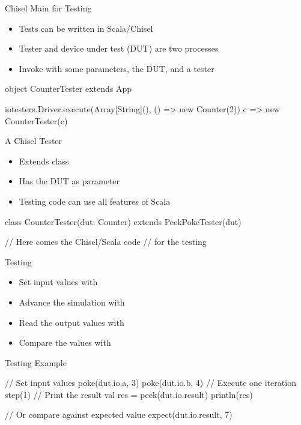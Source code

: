 \begin{frame}[fragile]{Chisel Main for Testing}
\begin{itemize}
\item Tests can be written in Scala/Chisel
\item Tester and device under test (DUT) are two processes
\item Invoke  with some parameters, the DUT, and a tester
\end{itemize}
\begin{chisel}
object CounterTester extends App {

  iotesters.Driver.execute(Array[String](), () => new Counter(2)) {
    c => new CounterTester(c)
  }
}
\end{chisel}
\end{frame}

\begin{frame}[fragile]{A Chisel Tester}
\begin{itemize}
\item Extends class 
\item Has the DUT as parameter
\item Testing code can use all features of Scala
\end{itemize}
\begin{chisel}
class CounterTester(dut: Counter) extends PeekPokeTester(dut) {

  // Here comes the Chisel/Scala code
  // for the testing
}
\end{chisel}
\end{frame}

\begin{frame}[fragile]{Testing}
\begin{itemize}
\item Set input values with 
\item Advance the simulation with 
\item Read the output values with 
\item Compare the values with 
\end{itemize}
\end{frame}

\begin{frame}[fragile]{Testing Example}
\begin{chisel}
// Set input values
poke(dut.io.a, 3)
poke(dut.io.b, 4)
// Execute one iteration
step(1)
// Print the result
val res = peek(dut.io.result)
println(res)

// Or compare against expected value
expect(dut.io.result, 7)
\end{chisel}
\end{frame}

